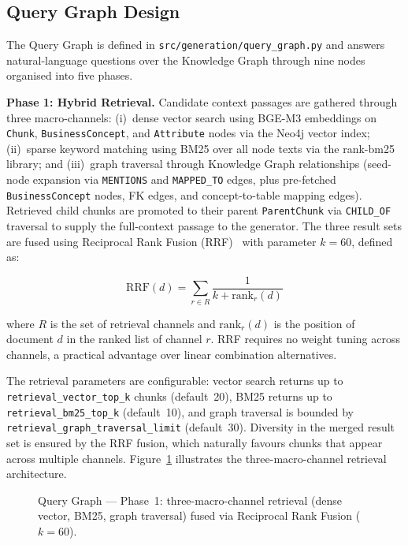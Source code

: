 \subsection{Query Graph Design}
\label{sec:sd:query}

The Query Graph is defined in \texttt{src/\allowbreak{}generation/\allowbreak{}query\_graph.py} and answers natural-language questions over the Knowledge Graph through nine nodes organised into five phases.

\textbf{Phase 1: Hybrid Retrieval.} Candidate context passages are gathered through three macro-channels: (i)~dense vector search using BGE-M3 embeddings on \texttt{Chunk}, \texttt{BusinessConcept}, and \texttt{Attribute} nodes via the Neo4j vector index; (ii)~sparse keyword matching using BM25 over all node texts via the rank-bm25 library; and (iii)~graph traversal through Knowledge Graph relationships (seed-node expansion via \texttt{MENTIONS} and \texttt{MAPPED\_TO} edges, plus pre-fetched \texttt{BusinessConcept} nodes, FK edges, and concept-to-table mapping edges). Retrieved child chunks are promoted to their parent \texttt{ParentChunk} via \texttt{CHILD\_OF} traversal to supply the full-context passage to the generator. The three result sets are fused using Reciprocal Rank Fusion (RRF)~\cite{cormack2009reciprocalrankfusionoutperforms} with parameter $k=60$, defined as:

\begin{equation}
\label{eq:rrf}
\text{RRF}(d) = \sum_{r \in R} \frac{1}{k + \text{rank}_r(d)}
\end{equation}

where $R$ is the set of retrieval channels and $\text{rank}_r(d)$ is the position of document $d$ in the ranked list of channel $r$. RRF requires no weight tuning across channels, a practical advantage over linear combination alternatives.

The retrieval parameters are configurable: vector search returns up to \texttt{retrieval\_\allowbreak{}vector\_\allowbreak{}top\_k} chunks (default~20), BM25 returns up to \texttt{retrieval\_\allowbreak{}bm25\_\allowbreak{}top\_k} (default~10), and graph traversal is bounded by \texttt{retrieval\_\allowbreak{}graph\_\allowbreak{}traversal\_\allowbreak{}limit} (default~30). Diversity in the merged result set is ensured by the RRF fusion, which naturally favours chunks that appear across multiple channels. Figure~\ref{fig:sd:query_p1} illustrates the three-macro-channel retrieval architecture.

\begin{figure}[htbp]
\centering
{}
\caption{Query Graph --- Phase~1: three-macro-channel retrieval (dense vector, BM25, graph traversal) fused via Reciprocal Rank Fusion ($k=60$).}
\label{fig:sd:query_p1}
\end{figure}

